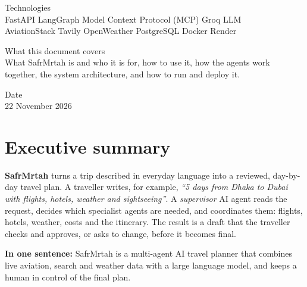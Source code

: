 \documentclass[11pt,a4paper]{article}
\begin{document}
\begin{titlepage}
\begin{minipage}{162mm}
\vspace{11mm}
{\color{muted}\small Technologies}\\[1.5mm]
{\color{slate}\large FastAPI \;\textbullet\; LangGraph \;\textbullet\; Model Context Protocol (MCP) \;\textbullet\; Groq LLM\\[1mm]
AviationStack \;\textbullet\; Tavily \;\textbullet\; OpenWeather \;\textbullet\; PostgreSQL \;\textbullet\; Docker \;\textbullet\; Render}

\vspace{14mm}
\begin{minipage}[t]{80mm}
{\color{muted}\small What this document covers}\\[1.5mm]
\color{slate}What SafrMrtah is and who it is for, how to use it, how the agents work together, the system architecture, and how to run and deploy it.
\end{minipage}\hfill
\begin{minipage}[t]{70mm}
{\color{muted}\small Date}\\[1.5mm]
{\color{slate}22 November 2026}
\end{minipage}
\end{minipage}
\restoregeometry
\end{titlepage}

\setcounter{page}{2}
{\hypersetup{linkcolor=slate}\tableofcontents}
\clearpage

\section{Executive summary}

\textbf{SafrMrtah} turns a trip described in everyday language into a reviewed, day-by-day travel plan. A traveller writes, for example, \emph{``5 days from Dhaka to Dubai with flights, hotels, weather and sightseeing''}. A \emph{supervisor} AI agent reads the request, decides which specialist agents are needed, and coordinates them: flights, hotels, weather, costs and the itinerary. The result is a draft that the traveller checks and approves, or asks to change, before it becomes final.

\begin{keybox}
\textbf{In one sentence:} SafrMrtah is a multi-agent AI travel planner that combines live aviation, search and weather data with a large language model, and keeps a human in control of the final plan.
\end{keybox}
\end{document}
